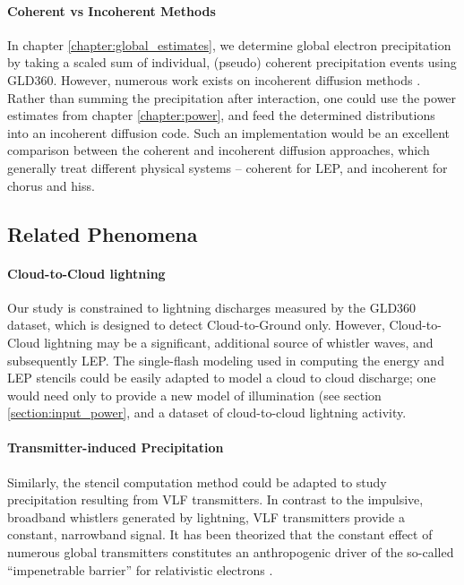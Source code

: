 \paragraph{Coherent vs Incoherent Methods}
In chapter \ref{chapter:global_estimates}, we determine global electron precipitation by taking a scaled sum of individual, (pseudo) coherent precipitation events using GLD360. However, numerous work exists on incoherent diffusion methods \citep{Kennel1966, Lyons1973, Glauert2005}. Rather than summing the precipitation after interaction, one could use the power estimates from chapter \ref{chapter:power}, and feed the determined distributions into an incoherent diffusion code. Such an implementation would be an excellent comparison between the coherent and incoherent diffusion approaches, which generally treat different physical systems -- coherent for LEP, and incoherent for chorus and hiss.

\subsection{Related Phenomena}
\paragraph{Cloud-to-Cloud lightning}
Our study is constrained to lightning discharges measured by the GLD360 dataset, which is designed to detect Cloud-to-Ground only. However, Cloud-to-Cloud lightning may be a significant, additional source of whistler waves, and subsequently LEP. The single-flash modeling used in computing the energy and LEP stencils could be easily adapted to model a cloud to cloud discharge; one would need only to provide a new model of illumination (see section \ref{section:input_power}, and a dataset of cloud-to-cloud lightning activity. 
\paragraph{Transmitter-induced Precipitation}
Similarly, the stencil computation method could be adapted to study precipitation resulting from VLF transmitters. In contrast to the impulsive, broadband whistlers generated by lightning, VLF transmitters provide a constant, narrowband signal. It has been theorized that the constant effect of numerous global transmitters constitutes an anthropogenic driver of the so-called ``impenetrable barrier'' for relativistic electrons \citep{Baker2014, Foster2016}.



